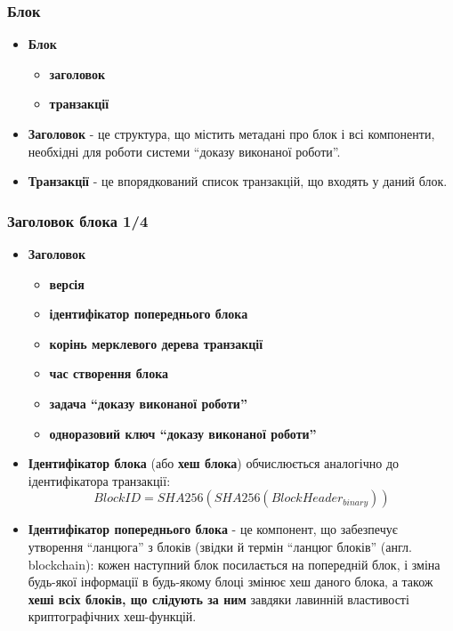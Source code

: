 \documentclass{beamer}
\begin{document}
\begin{frame}
  \frametitle{Блок}
  \begin{itemize}
  \item \textbf{Блок}
    \begin{itemize}
    \item \textbf{заголовок}
    \item \textbf{транзакції}
    \end{itemize}
  \item \textbf{Заголовок} - це структура, що містить метадані про блок і всі
    компоненти, необхідні для роботи системи ``доказу виконаної роботи''.
  \item \textbf{Транзакції} - це впорядкований список транзакцій, що входять у
    даний блок.
  \end{itemize}
\end{frame}

\begin{frame}
  \frametitle{Заголовок блока 1/4}
  \begin{small}
    \begin{itemize}
    \item \textbf{Заголовок}
      \begin{itemize}
      \item \textbf{версія}
      \item \textbf{ідентифікатор попереднього блока}
      \item \textbf{корінь мерклевого дерева транзакції}
      \item \textbf{час створення блока}
      \item \textbf{задача ``доказу виконаної роботи''}
      \item \textbf{одноразовий ключ ``доказу виконаної роботи''}
      \end{itemize}
    \item \textbf{Ідентифікатор блока} (або \textbf{хеш блока}) обчислюється
      аналогічно до ідентифікатора транзакції:
      $$BlockID = SHA256(SHA256(BlockHeader_{binary}))$$
    \item \textbf{Ідентифікатор попереднього блока} - це компонент, що забезпечує
      утворення ``ланцюга'' з блоків (звідки й термін ``ланцюг блоків''
      (англ. blockchain): кожен наступний блок посилається на попередній блок, і
      зміна будь-якої інформації в будь-якому блоці змінює хеш даного блока, а
      також \textbf{хеші всіх блоків, що слідують за ним} завдяки лавинній
      властивості криптографічних хеш-функцій.
    \end{itemize}
  \end{small}
\end{frame}
\end{document}
